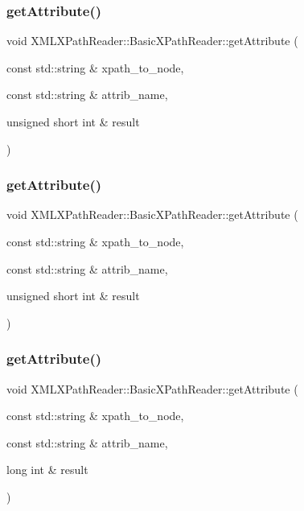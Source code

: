 \subsubsection{\texorpdfstring{getAttribute()}{getAttribute()}\hspace{0.1cm}{\footnotesize\ttfamily [14/30]}}
{\footnotesize\ttfamily void X\+M\+L\+X\+Path\+Reader\+::\+Basic\+X\+Path\+Reader\+::get\+Attribute (\begin{DoxyParamCaption}\item[{const std\+::string \&}]{xpath\+\_\+to\+\_\+node,  }\item[{const std\+::string \&}]{attrib\+\_\+name,  }\item[{unsigned short int \&}]{result }\end{DoxyParamCaption})}

\mbox{\label{classXMLXPathReader_1_1BasicXPathReader_a4ba2827d293f02d0470c1b156258ee96}} 
\subsubsection{\texorpdfstring{getAttribute()}{getAttribute()}\hspace{0.1cm}{\footnotesize\ttfamily [15/30]}}
{\footnotesize\ttfamily void X\+M\+L\+X\+Path\+Reader\+::\+Basic\+X\+Path\+Reader\+::get\+Attribute (\begin{DoxyParamCaption}\item[{const std\+::string \&}]{xpath\+\_\+to\+\_\+node,  }\item[{const std\+::string \&}]{attrib\+\_\+name,  }\item[{unsigned short int \&}]{result }\end{DoxyParamCaption})}

\mbox{\label{classXMLXPathReader_1_1BasicXPathReader_a93aba6e8e1f1bb9ea9646fd9c785ba17}} 
\subsubsection{\texorpdfstring{getAttribute()}{getAttribute()}\hspace{0.1cm}{\footnotesize\ttfamily [16/30]}}
{\footnotesize\ttfamily void X\+M\+L\+X\+Path\+Reader\+::\+Basic\+X\+Path\+Reader\+::get\+Attribute (\begin{DoxyParamCaption}\item[{const std\+::string \&}]{xpath\+\_\+to\+\_\+node,  }\item[{const std\+::string \&}]{attrib\+\_\+name,  }\item[{long int \&}]{result }\end{DoxyParamCaption})}

